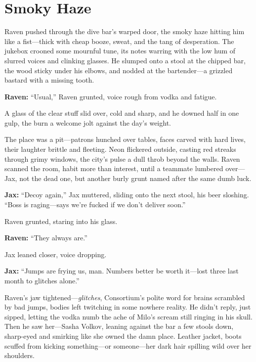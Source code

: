 \documentclass[12pt]{book}
\begin{document}
\section{Smoky Haze}

Raven pushed through the dive bar’s warped door, the smoky haze hitting him like a fist—thick with cheap booze, sweat, and the tang of desperation. The jukebox crooned some mournful tune, its notes warring with the low hum of slurred voices and clinking glasses. He slumped onto a stool at the chipped bar, the wood sticky under his elbows, and nodded at the bartender—a grizzled bastard with a missing tooth.

\vspace{0.5em}
\textbf{Raven:} “Usual,” Raven grunted, voice rough from vodka and fatigue.

A glass of the clear stuff slid over, cold and sharp, and he downed half in one gulp, the burn a welcome jolt against the day’s weight.

The place was a pit—patrons hunched over tables, faces carved with hard lives, their laughter brittle and fleeting. Neon flickered outside, casting red streaks through grimy windows, the city’s pulse a dull throb beyond the walls. Raven scanned the room, habit more than interest, until a teammate lumbered over—Jax, not the dead one, but another burly grunt named after the same dumb luck.

\vspace{0.5em}
\textbf{Jax:} “Decoy again,” Jax muttered, sliding onto the next stool, his beer sloshing. “Boss is raging—says we’re fucked if we don’t deliver soon.”

Raven grunted, staring into his glass.

\vspace{0.5em}
\textbf{Raven:} “They always are.”

Jax leaned closer, voice dropping.

\vspace{0.5em}
\textbf{Jax:} “Jumps are frying us, man. Numbers better be worth it—lost three last month to glitches alone.”

Raven’s jaw tightened—\textit{glitches}, Consortium’s polite word for brains scrambled by bad jumps, bodies left twitching in some nowhere reality. He didn’t reply, just sipped, letting the vodka numb the ache of Milo’s scream still ringing in his skull. Then he saw her—Sasha Volkov, leaning against the bar a few stools down, sharp-eyed and smirking like she owned the damn place. Leather jacket, boots scuffed from kicking something—or someone—her dark hair spilling wild over her shoulders.
\end{document}
